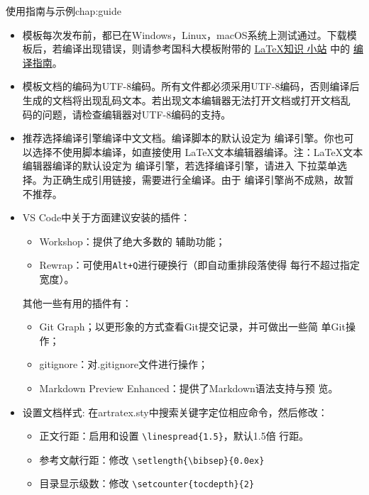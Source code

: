 \begin{cuzchapter}{使用指南与示例}{chap:guide}
	\begin{itemize}
		\item 模板每次发布前，都已在Windows，Linux，macOS系统上测试通过。下载模
		      板后，若编译出现错误，则请参考国科大模板附带的
		      \href{https://github.com/mohuangrui/ucasthesis/wiki}{\LaTeX{}知识
			      小站} 中的
		      \href{https://github.com/mohuangrui/ucasthesis/wiki/%E7%BC%96%E8%AF%91%E6%8C%87%E5%8D%97}{编
			      译指南}。
		\item 模板文档的编码为UTF-8编码。所有文件都必须采用UTF-8编码，否则编译后
		      生成的文档将出现乱码文本。若出现文本编辑器无法打开文档或打开文档乱
		      码的问题，请检查编辑器对UTF-8编码的支持。
		\item 推荐选择编译引擎编译中文文档。编译脚本的默认设定为
		      编译引擎。你也可以选择不使用脚本编译，如直接使用
		      \LaTeX{}文本编辑器编译。注：\LaTeX{}文本编辑器编译的默认设定为
		      编译引擎，若选择编译引擎，请进入
		      下拉菜单选择。为正确生成引用链接，需要进行全编译。由于
		      编译引擎尚不成熟，故暂不推荐。
		\item VS Code中关于方面建议安装的插件：
		      \begin{itemize}
			      \item {} Workshop：提供了绝大多数的
			            辅助功能；
			      \item Rewrap：可使用\verb|Alt+Q|进行硬换行（即自动重排段落使得
			            每行不超过指定宽度）。
		      \end{itemize}
		      其他一些有用的插件有：
		      \begin{itemize}
			      \item Git Graph；以更形象的方式查看Git提交记录，并可做出一些简
			            单Git操作；
			      \item gitignore：对.gitignore文件进行操作；
			      \item Markdown Preview Enhanced：提供了Markdown语法支持与预
			            览。
		      \end{itemize}
		\item 设置文档样式: 在artratex.sty中搜索关键字定位相应命令，然后修改：
		      \begin{itemize}
			      \item 正文行距：启用和设置 \verb|\linespread{1.5}|，默认1.5倍
			            行距。
			      \item 参考文献行距：修改 \verb|\setlength{\bibsep}{0.0ex}|
			      \item 目录显示级数：修改 \verb|\setcounter{tocdepth}{2}|

\end{itemize}
\end{itemize}
\end{cuzchapter}
